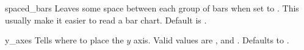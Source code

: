 \begin{AttrDecl}{spaced\_bars}
Leaves some space between each group of bars when set to . This
usually make it easier to read a bar chart. Default is .
\end{AttrDecl}

\begin{AttrDecl}{y\_axes}
Tells \thisclass where to place the $y$ axis. Valid
values are ,  and . Defaults
to .
\end{AttrDecl}

